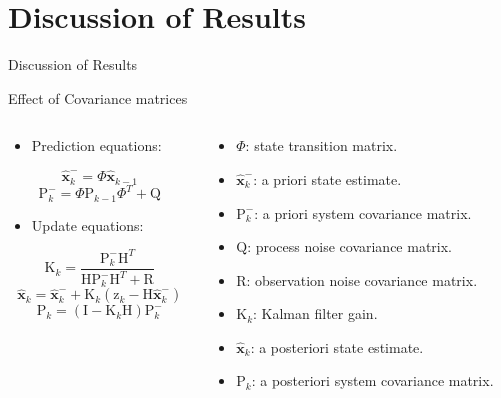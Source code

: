 \documentclass[10pt,aspectratio=1610]{beamer}
\begin{document}
\section{Discussion of Results}
\label{sec:discussion}
\begin{frame}{Discussion of Results}
\begin{block}{Effect of Covariance matrices}
\begin{columns}
\begin{column}{.5\textwidth}
\begin{itemize}
\item Prediction equations:
\end{itemize}

\begin{equation}
\mathbf{\hat{x}}_{k}^{-}=\Phi\mathbf{\hat{x}}_{k-1}
\label{eq:Kal_fus_pred1}
\nonumber
\end{equation}
\begin{equation}
\mbox{P}_{k}^{-}=\Phi\mbox{P}_{k-1}\Phi^{T}+\mbox{Q}
\label{eq:Kal_fus_pred2}
\nonumber
\end{equation}

\begin{itemize}
\item Update equations:
\end{itemize}

\begin{equation}
\mbox{K}_{k}=\frac{\mbox{P}_{k}^{-}\mbox{H}^{T}}{\mbox{H}\mbox{P}_{k}^{-}\mbox{H}^{T}+\mbox{R}}
\label{eq:Kalman_gain_update_phase}
\nonumber
\end{equation}
\begin{equation}
\mathbf{\hat{x}}_{k}=\mathbf{\hat{x}}_{k}^{-}+\mbox{K}_{k}(\mbox{z}_{k}-\mbox{H}\mathbf{\hat{x}}_{k}^{-})
\label{eq:state_vector_update_phase}
\nonumber
\end{equation}
\begin{equation}
\mbox{P}_{k}=(\mbox{I}-\mbox{K}_{k}\mbox{H})\mbox{P}_{k}^{-}
\label{eq:covariance_matrix_update_phase}
\nonumber
\end{equation}
\end{column}
\begin{column}{.5\textwidth}
\begin{itemize}
	\item $\Phi$: state transition matrix.
	\item $\mathbf{\hat{x}}_{k}^{-}$: a priori state estimate.
	\item $\mbox{P}_{k}^{-}$: a priori system covariance matrix.
	\item $\mbox{Q}$: process noise covariance matrix.
	\item R: observation noise covariance matrix.
	\item $\mbox{K}_{k}$: Kalman filter gain.
	\item $\mathbf{\hat{x}}_{k}$: a posteriori state estimate.
	\item $\mbox{P}_{k}$: a posteriori system covariance matrix.
\end{itemize}
\end{column}
\end{columns}
\end{block}
\end{frame}
\end{document}
